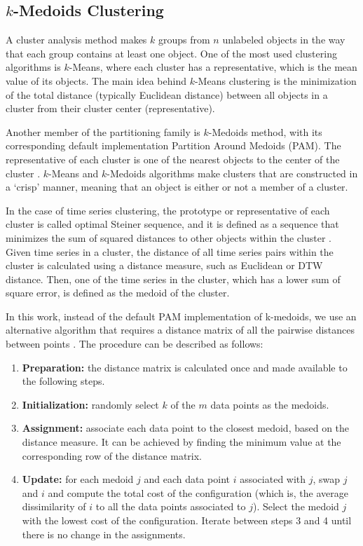 
\subsection{$k$-Medoids Clustering }
\label{Sec:kMedoidsClustering}

A cluster analysis method makes $k$ groups from $n$ unlabeled objects in the way that each group contains at least one object. One of the most used clustering algorithms is $k$-Means, where each cluster has a representative, which is the mean value of its objects. The main idea behind $k$-Means clustering is the minimization of the total distance (typically Euclidean distance) between all objects in a cluster from their cluster center (representative).

Another member of the partitioning family is $k$-Medoids method, with its corresponding default implementation Partition Around Medoids (PAM). The representative of each cluster is one of the nearest objects to the center of the cluster \cite{Kaufman2009}. $k$-Means and $k$-Medoids algorithms make clusters that are constructed in a `crisp' manner, meaning that an object is either or not a member of a cluster.

In the case of time series clustering, the prototype or representative of each cluster is called optimal Steiner sequence, and it is defined as a sequence that minimizes the sum of squared distances to other objects within the cluster \cite{Kaufman2009}. Given time series in a cluster, the distance of all time series pairs within the cluster is calculated using a distance measure, such as Euclidean or DTW distance. Then, one of the time series in the cluster, which has a lower sum of square error, is defined as the medoid of the cluster.

In this work, instead of the default PAM implementation of k-medoids, we use an alternative algorithm that requires a distance matrix of all the pairwise distances between points \cite{Park2009}. The procedure can be described as follows:

\begin{enumerate}
    \item \textbf{Preparation:} the distance matrix is calculated once and made available to the following steps.
    \item \textbf{Initialization:} randomly select $k$ of the $m$ data points as the medoids.
    \item \textbf{Assignment:} associate each data point to the closest medoid, based on the distance measure. It can be achieved by finding the minimum value at the corresponding row of the distance matrix.
    \item \textbf{Update:} for each medoid $j$ and each data point $i$ associated with $j$, swap $j$ and $i$ and compute the total cost of the configuration (which is, the average dissimilarity of $i$ to all the data points associated to $j$). 
    Select the medoid $j$ with the lowest cost of the configuration. Iterate between steps 3 and 4 until there is no change in the assignments.
\end{enumerate}

